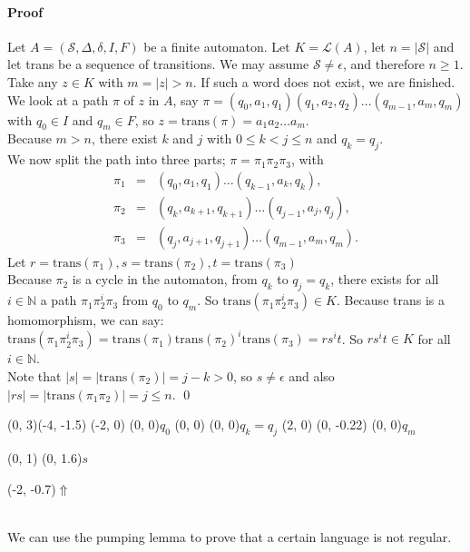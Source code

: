 \documentclass{article}
\begin{document}
\paragraph{Proof}
Let $A = (\mathcal{S}, \Delta, \delta, I, F)$ be a finite automaton. Let
$K = \mathcal{L}(A)$, let $n = |\mathcal{S}|$ and let trans be a sequence of
transitions. We may assume $\mathcal{S} \ne \epsilon$, and therefore
$n \ge 1$.\\
Take any $z \in K$ with $m = |z| > n$. If such a word does not exist, we are
finished. We look at a path $\pi$ of $z$ in $A$, say
$\pi = (q_0, a_1, q_1)(q_1, a_2, q_2)\ldots(q_{m - 1}, a_m, q_m)$ with
$q_0 \in I$ and $q_m \in F$, so $z = \mathrm{trans}(\pi) = a_1a_2\ldots a_m$.\\
Because $m > n$, there exist $k$ and $j$ with $0 \le k < j \le n$ and
$q_k = q_j$.\\
We now split the path into three parts; $\pi = \pi_1 \pi_2 \pi_3$, with
\begin{eqnarray*}
  \pi_1 &=& (q_0, a_1, q_1) \ldots (q_{k - 1}, a_k, q_k),\\
  \pi_2 &=& (q_k, a_{k + 1}, q_{k + 1}) \ldots (q_{j - 1}, a_j, q_j),\\
  \pi_3 &=& (q_j, a_{j + 1}, q_{j + 1}) \ldots (q_{m - 1}, a_m, q_m).
\end{eqnarray*}
Let $r = \mathrm{trans}(\pi_1), s = \mathrm{trans}(\pi_2),
     t = \mathrm{trans}(\pi_3)$\\
Because $\pi_2$ is a cycle in the automaton, from $q_k$ to $q_j = q_k$, there
exists for all $i \in \mathbb{N}$ a path $\pi_1 \pi_2^i \pi_3$ from $q_0$ to
$q_m$. So $\mathrm{trans}(\pi_1 \pi_2^i \pi_3) \in K$. Because trans is a
homomorphism, we can say:  $\mathrm{trans}(\pi_1 \pi_2^i \pi_3) =
\mathrm{trans}(\pi_1) \mathrm{trans}(\pi_2)^i \mathrm{trans}(\pi_3) = r s^i t$.
So $r s^i t \in K$ for all $i \in \mathbb{N}$.\\
Note that $|s| = |\mathrm{trans}(\pi_2)| = j - k > 0$, so $s \ne \epsilon$
and also $|rs| = |\mathrm{trans}(\pi_1 \pi_2)| = j \le n$. \qed\\
\begin{graph}(0, 3)(-4, -1.5)
  (-2, 0) (0, 0){\bs$q_0$\es}
  (0, 0) (0, 0){\bS$q_k=q_j$\eS}
  (2, 0)
    (0, -0.22){} (0, 0){\bs$q_m$\es}

   
  (0, 1) \freetext(0, 1.6){$s$}
   

  \freetext(-2, -0.7){$\Uparrow$}
\end{graph}\\
We can use the pumping lemma to prove that a certain language is not regular.
\end{document}
